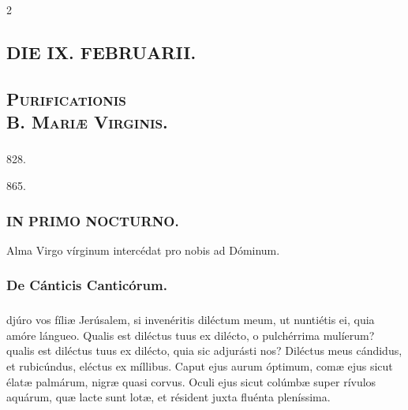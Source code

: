 \documentclass[9pt,twoside]{extarticle}
\begin{document}
\begin{multicols}{2}
\subsection*{\center \textsc{DIE IX. FEBRUARII.}}
\subsubsection*{\center {}}
\subsection*{\center \textsc{Purificationis\\ B. Mariæ Virginis.}}
\subsubsection*{\center {}}
\begin{tightlist}{}
\item {} 828. 
\item {} 865. 
\end{tightlist}

\subsubsection*{\center \textsc{IN PRIMO NOCTURNO.}}
\begin{tightlist}{}
\item {\small {} Alma Virgo vírginum intercédat pro nobis ad Dóminum.}
\end{tightlist}
\subsubsection*{\center De Cánticis Canticórum.}
\subsubsection*{\center {}}
djúro vos fíliæ Jerúsalem, si invenéritis diléctum meum, ut nuntiétis ei, quia amóre lángueo. Qualis est diléctus tuus ex dilécto, o pulchérrima mulíerum? qualis est diléctus tuus ex dilécto, quia sic adjurásti nos? Diléctus meus cándidus, et rubicúndus, eléctus ex míllibus. Caput ejus aurum óptimum, comæ ejus sicut élatæ palmárum, nigræ quasi corvus. Oculi ejus sicut colúmbæ super rívulos aquárum, quæ lacte sunt lotæ, et résident juxta fluénta pleníssima.


\end{multicols}
\end{document}
